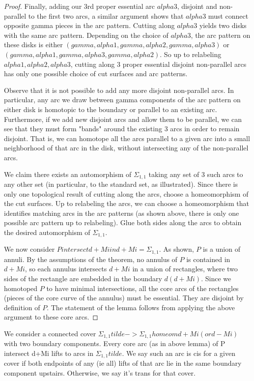 \documentclass[12pt]{amsart}
\theoremstyle{definition}
\newcommand{\Si}{\Sigma}
\begin{document}
\begin{proof}
Finally, adding our 3rd proper essential arc $alpha3$, disjoint and non-parallel
to the first two arcs, a similar argument shows that $alpha3$ must connect
opposite gamma pieces in the arc pattern. Cutting along $alpha3$ yields two disks
with the same arc pattern. Depending on the choice of $alpha3$, the arc pattern
on these disks is either $(gamma,alpha1,gamma,alpha2,gamma,alpha3)$ or
$(gamma,alpha1,gamma,alpha3,gamma,alpha2)$. So up to relabeling
$alpha1,alpha2,alpha3$, cutting along 3 proper essential disjoint non-parallel
arcs has only one possible choice of cut surfaces and arc patterns.

Observe that it is not possible to add any more disjoint non-parallel arcs. In
particular, any arc we draw between gamma components of the arc pattern on
either disk is homotopic to the boundary or parallel to an existing arc.
Furthermore, if we add new disjoint arcs and allow them to be parallel, we can
see that they must form "bands" around the existing 3 arcs in order to remain
disjoint. That is, we can homotope all the arcs parallel to a given arc into
a small neighborhood of that arc in the disk, without intersecting any of the
non-parallel arcs.

We claim there exists an automorphism of $\Si_{1,1}$ taking any set of 3 such arcs to
any other set (in particular, to the standard set, as illustrated). Since there
is only one topological result of cutting along the arcs, choose
a homeomorphism of the cut surfaces. Up to relabeling the arcs, we can choose
a homeomorphism that identifies matching arcs in the arc patterns (as shown
above, there is only one possible arc pattern up to relabeling). Glue both
sides along the arcs to obtain the desired automorphism of $\Si_{1,1}$.

We now consider $P intersect d+Mi in d+Mi = \Si_{1,1}$. As shown, $P$ is a union of
annuli. By the assumptions of the theorem, no annulus of $P$ is contained in
$d+Mi$, so each annulus intersects $d+Mi$ in a union of rectangles, where two sides
of the rectangle are embedded in the boundary $d(d+Mi)$. Since we homotoped $P$ to
have minimal intersections, all the core arcs of the rectangles (pieces of the
core curve of the annulus) must be essential. They are disjoint by definition
of $P$. The statement of the lemma follows from applying the above argument to
these core arcs.

\end{proof}

We consider a connected cover $\Si_{1,1}tilde -> \Si_{1,1} homeom d+Mi (or
d-Mi)$ with two
boundary components. Every core arc (as in above lemma) of P intersect d+Mi
lifts to arcs in $\Si_{1,1}tilde$. We say such an arc is cis for a given cover if
both endpoints of any (ie all) lifts of that arc lie in the same boundary
component upstairs. Otherwise, we say it's trans for that cover.
\end{document}
